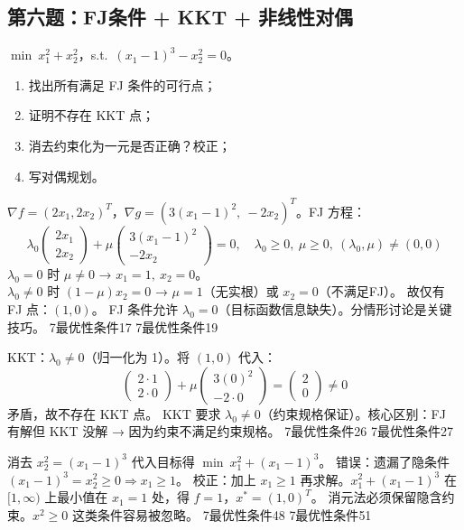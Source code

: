 \subsection*{第六题：FJ条件 + KKT + 非线性对偶}

\noindent $\min\ x_1^2 + x_2^2$，s.t.\ $(x_1-1)^3 - x_2^2 = 0$。
\begin{enumerate}
  \item[(1)] 找出所有满足 FJ 条件的可行点；
  \item[(2)] 证明不存在 KKT 点；
  \item[(3)] 消去约束化为一元是否正确？校正；
  \item[(4)] 写对偶规划。
\end{enumerate}

  {$\nabla f = (2x_1, 2x_2)^T$，$\nabla g = (3(x_1-1)^2,\ -2x_2)^T$。FJ 方程：
  \[
  \lambda_0 \begin{pmatrix}2x_1\\2x_2\end{pmatrix}
  + \mu \begin{pmatrix}3(x_1-1)^2\\-2x_2\end{pmatrix} = 0,\quad
  \lambda_0\ge 0,\ \mu\ge 0,\ (\lambda_0,\mu)\neq(0,0)
  \]
  $\lambda_0=0$ 时 $\mu\neq 0$ → $x_1=1,\ x_2=0$。\\
  $\lambda_0\neq 0$ 时 $(1-\mu)x_2=0$ → $\mu=1$（无实根）或 $x_2=0$（不满足FJ）。
  故仅有 FJ 点：$(1,0)$。}
  {FJ 条件允许 $\lambda_0=0$（目标函数信息缺失）。分情形讨论是关键技巧。}
  {7最优性条件}{17}
  {7最优性条件}{19}

  {KKT：$\lambda_0\neq 0$（归一化为 1）。将 $(1,0)$ 代入：
  \[
  \begin{pmatrix}2\cdot 1\\2\cdot 0\end{pmatrix}
  + \mu\begin{pmatrix}3(0)^2\\-2\cdot 0\end{pmatrix} = \begin{pmatrix}2\\0\end{pmatrix} \neq 0
  \]
  矛盾，故不存在 KKT 点。}
  {KKT 要求 $\lambda_0\neq 0$（约束规格保证）。核心区别：FJ 有解但 KKT 没解 → 因为约束不满足约束规格。}
  {7最优性条件}{26}
  {7最优性条件}{27}

  {消去 $x_2^2 = (x_1-1)^3$ 代入目标得 $\min\ x_1^2 + (x_1-1)^3$。
  错误：遗漏了隐条件 $(x_1-1)^3 = x_2^2 \ge 0 \Rightarrow x_1 \ge 1$。
  校正：加上 $x_1 \ge 1$ 再求解。$x_1^2+(x_1-1)^3$ 在 $[1,\infty)$ 上最小值在 $x_1=1$ 处，得 $f=1$，$x^*=(1,0)^T$。}
  {消元法必须保留隐含约束。$x^2 \ge 0$ 这类条件容易被忽略。}
  {7最优性条件}{48}
  {7最优性条件}{51}

